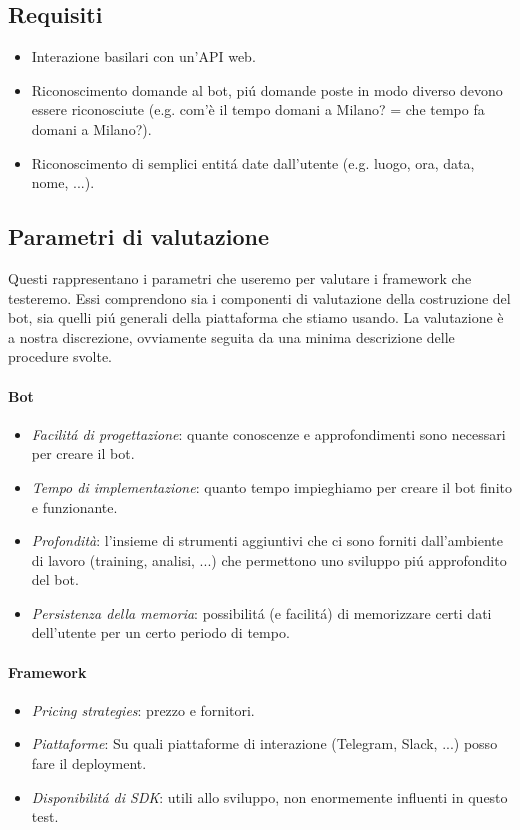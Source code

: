 \documentclass[]{article}
\begin{document}
\subsection{Requisiti}
\begin{itemize}
\item Interazione basilari con un’API web.
\item Riconoscimento domande al bot, piú domande poste in modo diverso devono essere riconosciute (e.g. com'è il tempo domani a Milano? = che tempo fa domani a Milano?).
\item Riconoscimento di semplici entitá date dall’utente (e.g. luogo, ora, data, nome, ...).
\end{itemize}

\subsection{Parametri di valutazione}
Questi rappresentano i parametri che useremo per valutare i framework che testeremo. Essi comprendono sia i componenti di valutazione della costruzione del bot, sia quelli piú generali della piattaforma che stiamo usando. La valutazione è a nostra discrezione, ovviamente seguita da una minima descrizione delle procedure svolte.

\paragraph{Bot}
\begin{itemize}
\item \textit{Facilitá di progettazione}: quante conoscenze e approfondimenti sono necessari per creare il bot.
\item \textit{Tempo di implementazione}: quanto tempo impieghiamo per creare il bot finito e funzionante.
\item \textit{Profondità}: l’insieme di strumenti aggiuntivi che ci sono forniti dall’ambiente di lavoro (training, analisi, ...) che permettono uno sviluppo piú approfondito del bot.
\item \textit{Persistenza della memoria}: possibilitá (e facilitá) di memorizzare certi dati dell’utente per un certo periodo di tempo.
\end{itemize}

\paragraph{Framework}
\begin{itemize}
\item \textit{Pricing strategies}: prezzo e fornitori.
\item \textit{Piattaforme}: Su quali piattaforme di interazione (Telegram, Slack, ...) posso fare il deployment.
\item \textit{Disponibilitá di SDK}: utili allo sviluppo, non enormemente influenti in questo test.
\end{itemize}
\end{document}
